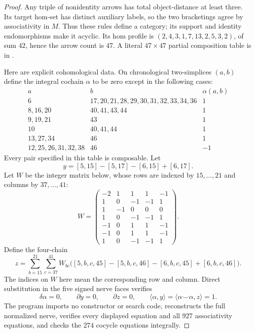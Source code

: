 \begin{proof}
Any triple of nonidentity arrows has total object-distance at
least three. Its target hom-set has distinct auxiliary labels,
so the two bracketings agree by associativity in $M$. Thus these
rules define a category; its support and identity endomorphisms
make it acyclic. Its hom profile is
$(2,4,3,1,7,13,2,5,3,2)$, of sum $42$, hence the arrow count
is $47$. A literal $47\times47$ partial composition table is in
.

Here are explicit cohomological data. On chronological
two-simplices $(a,b)$ define the integral cochain $\alpha$ to be
zero except in the following cases:
\[
\begin{array}{c|l|r}
a&b&\alpha(a,b)\\\hline
6&17,20,21,28,29,30,31,32,33,34,36&1\\
8,16,20&40,41,43,44&1\\
9,19,21&43&1\\
10&40,41,44&1\\
13,27,34&46&1\\
12,25,26,31,32,38&46&-1
\end{array}
\]
Every pair specified in this table is composable. Let
\[
 y=[5,15]-[5,17]-[6,15]+[6,17].
\]
Let $W$ be the integer matrix below, whose rows are indexed by
$15,\ldots,21$ and columns by $37,\ldots,41$:
\[
W=\begin{pmatrix}
-2&1&1&1&-1\\
1&0&-1&-1&1\\
1&-1&0&0&0\\
1&0&-1&-1&1\\
-1&0&1&1&-1\\
-1&0&1&1&-1\\
1&0&-1&-1&1
\end{pmatrix}.
\]
Define the four-chain
\[
 z=\sum_{b=15}^{21}\sum_{c=37}^{41}W_{bc}
 \bigl([5,b,c,45]-[5,b,c,46]
       -[6,b,c,45]+[6,b,c,46]\bigr).
\]
The indices on $W$ here mean the corresponding row and column.
Direct substitution in the five signed nerve faces verifies
\[
 \delta\alpha=0,\qquad \partial y=0,\qquad \partial z=0,
 \qquad \langle\alpha,y\rangle
 =\langle\alpha\smile\alpha,z\rangle=1.
\]
The program 
imports no constructor or search code, reconstructs the full
normalized nerve, verifies every displayed equation and all
$927$ associativity equations, and checks the $274$ cocycle
equations integrally.


\end{proof}

